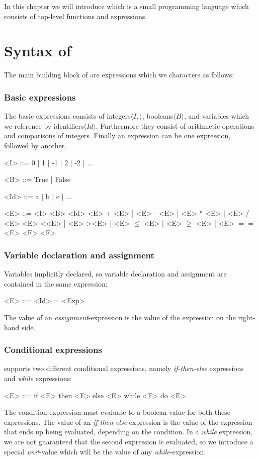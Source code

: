 In this chapter we will introduce \explanguage which is a small programming language which consists of top-level functions and expressions.

\section{Syntax of \explanguage}


The main building block of \explanguage are expressions which we characters as follows:

\subsubsection{Basic expressions}

The basic expressions consists of integers$\langle I, \rangle$, booleans$\langle B \rangle$,  and variables which we reference by identifiers$\langle Id \rangle$. Furthermore they consist of arithmetic operations and comparisons of integers. Finally an expression can be one expression, followed by another.
\begin{grammar}
	<I> ::= 0 | 1 | -1 | 2 | -2 | $\ldots$
	
	<B> ::= True | False 
	
	<Id> ::= a | b | c | $\ldots$ 
	
	<E> ::= <I> 
	\alt <Id>
	 + <E> | <E> - <E> | <E> * <E> | <E> / <E>
	 \textless <E> | <E> \textgreater <E> | <E> $\leq$ <E> | <E> $\geq$ <E> | <E> $==$ <E>
	 <E>
\end{grammar}
\newpage
\subsubsection{Variable declaration and assignment}
Variables implicitly declared, so variable declaration and assignment are contained in the same expression:
\begin{grammar}
	<E> ::= <Id> = <Exp>
\end{grammar} 
The value of an \textsl{assignment}-expression is the value of the expression on the right-hand side.
\subsubsection{Conditional expressions}
\explanguage supports two different conditional expressions, namely \textsl{if-then-else} expressions and \textsl{while} expressions:

\begin{grammar}
	<E> ::= if <E> then <E> else <E>
	\alt while <E> do <E>
\end{grammar}
The condition expression must evaluate to a boolean value for both these expressions. 
The value of an \textsl{if-then-else} expression is
 the value of the expression that ends up being evaluated, depending on the condition. In a \textsl{while} expression, we are not guaranteed that the second expression is evaluated, so we introduce a special \textsl{unit}-value which will be the value of any \textsl{while}-expression.

